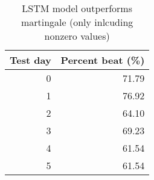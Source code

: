 \begin{table}[H]
\centering
\caption{LSTM model outperforms martingale (only inlcuding nonzero values)}
\label{tab:percent_days_outperform_total_1}
\begin{tabular}{rr}
\toprule
Test day & Percent beat (\%) \\
\midrule
0 & 71.79 \\
1 & 76.92 \\
2 & 64.10 \\
3 & 69.23 \\
4 & 61.54 \\
5 & 61.54 \\
\bottomrule
\end{tabular}
\end{table}
